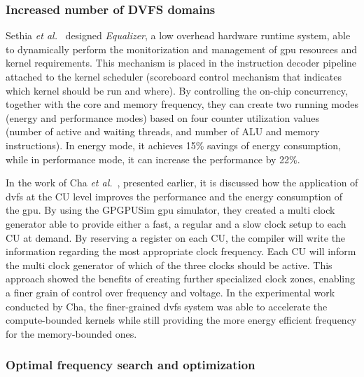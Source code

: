 \subsubsection{Increased number of DVFS domains}


Sethia \textit{et al.}~\cite{sethia_equalizer:_2014} designed \textit{Equalizer}, a low overhead hardware runtime system, able to dynamically perform the monitorization and management of \acrshort{gpu} resources and kernel requirements. This mechanism is placed in the instruction decoder pipeline attached to the kernel scheduler (scoreboard control mechanism that indicates which kernel should be run and where). By controlling the on-chip concurrency, together with the core and memory frequency, they can create two running modes (energy and performance modes) based on four counter utilization values (number of active and waiting threads, and number of ALU and memory instructions). In energy mode, it achieves 15\% savings of energy consumption, while in performance mode, it can increase the performance by 22\%.

In the work of Cha \textit{et al.}~\cite{cha_core-level_2018}, presented earlier, it is discussed how the application of \acrshort{dvfs} at the CU level improves the performance and the energy consumption of the \acrshort{gpu}. By using the GPGPUSim \acrshort{gpu} simulator, they created a multi clock generator able to provide either a fast, a regular and a slow clock setup to each CU at demand.  By reserving a register on each CU, the compiler will write the information regarding the most appropriate clock frequency. Each CU will inform the multi clock generator of which of the three clocks should be active. This approach showed the benefits of creating further specialized clock zones, enabling a finer grain of control over frequency and voltage. In the experimental work conducted by Cha, the finer-grained \acrshort{dvfs} system was able to accelerate the compute-bounded kernels while still providing the more energy efficient frequency for the memory-bounded ones.

\subsubsection{Optimal frequency search and optimization}

